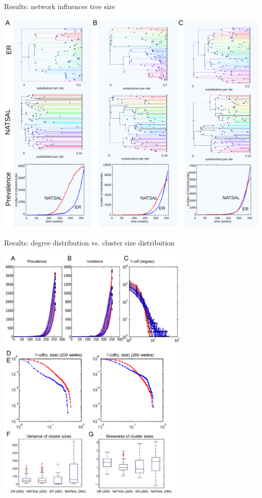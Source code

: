 \documentclass{beamer}
\begin{document}
\begin{frame}{Results: network influences tree size}
    \begin{center}
        \vspace{-0.5cm}
        \includegraphics[height=0.8\textheight]{f4}
    \end{center}
\end{frame}

\begin{frame}{Results: degree distribution vs. cluster size distribution}
    \begin{center}
        \vspace{-0.5cm}
        \includegraphics[width=0.7\textwidth, trim=0 2.3cm 0 0, clip=true]{f5}
    \end{center}
\end{frame}
\end{document}
